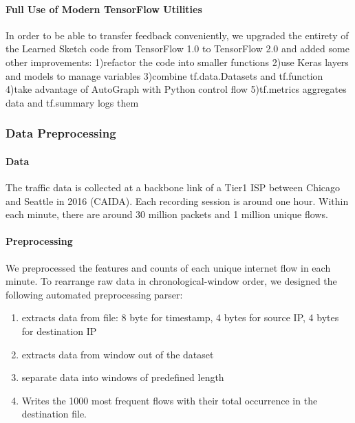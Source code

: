 \paragraph{Full Use of Modern TensorFlow Utilities}
In order to be able to transfer feedback conveniently, we upgraded the entirety of the Learned Sketch code from TensorFlow 1.0 to TensorFlow 2.0 and added some other improvements: 1)refactor the code into smaller functions 2)use Keras layers and models to manage variables 3)combine tf.data.Datasets and tf.function 4)take advantage of AutoGraph with Python control flow 5)tf.metrics aggregates data and tf.summary logs them 


\subsubsection{Data Preprocessing}

\paragraph{Data}
The traffic data is collected at a backbone link of a Tier1 ISP between Chicago and Seattle in 2016 (CAIDA). Each recording session is around one hour. Within each minute, there are around 30 million packets and 1 million unique flows.

\paragraph{Preprocessing}
We preprocessed the features and counts of each unique internet flow in each minute. To rearrange raw data in chronological-window order, we designed the following automated preprocessing parser:

\begin{enumerate}
    \item extracts data from file: 8 byte for timestamp, 4 bytes for source IP, 4 bytes for destination IP
    
    \item extracts data from window out of the dataset 
    
    \item separate data into windows of predefined length
    
    \item Writes the 1000 most frequent flows with their total occurrence in the destination file.
\end{enumerate}

